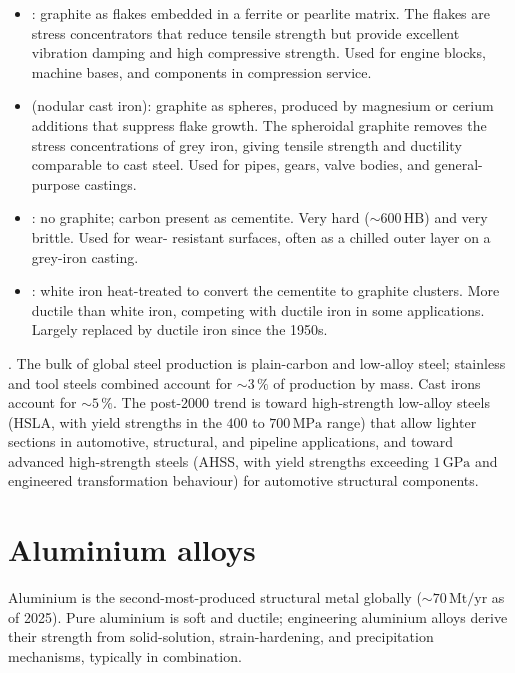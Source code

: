 \begin{itemize}[leftmargin=*]
\item {}: graphite as flakes embedded in a ferrite
  or pearlite matrix. The flakes are stress concentrators that
  reduce tensile strength but provide excellent vibration damping
  and high compressive strength. Used for engine blocks, machine
  bases, and components in compression service.
\item {} (nodular cast iron): graphite as
  spheres, produced by magnesium or cerium additions that suppress
  flake growth. The spheroidal graphite removes the stress
  concentrations of grey iron, giving tensile strength and ductility
  comparable to cast steel. Used for pipes, gears, valve bodies, and
  general-purpose castings.
\item {}: no graphite; carbon present as cementite.
  Very hard ($\sim 600\,\text{HB}$) and very brittle. Used for wear-
  resistant surfaces, often as a chilled outer layer on a grey-iron
  casting.
\item {}: white iron heat-treated to convert
  the cementite to graphite clusters. More ductile than white iron,
  competing with ductile iron in some applications. Largely replaced
  by ductile iron since the 1950s.
\end{itemize}

. The bulk of global steel
production is plain-carbon and low-alloy steel; stainless and tool
steels combined account for $\sim 3\,\%$ of production by mass. Cast
irons account for $\sim 5\,\%$. The post-2000 trend is toward
high-strength low-alloy steels (HSLA, with yield strengths in the
$400$ to $700\,\text{MPa}$ range) that allow lighter sections in
automotive, structural, and pipeline applications, and toward
advanced high-strength steels (AHSS, with yield strengths exceeding
$1\,\text{GPa}$ and engineered transformation behaviour) for
automotive structural components.

\section{Aluminium alloys}

Aluminium is the second-most-produced structural metal globally
($\sim 70\,\text{Mt}/\text{yr}$ as of 2025). Pure aluminium is soft
and ductile; engineering aluminium alloys derive their strength from
solid-solution, strain-hardening, and precipitation mechanisms,
typically in combination.

